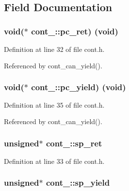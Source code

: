 \subsection{Field Documentation}
\subsubsection[{\texorpdfstring{pc\+\_\+ret}{pc_ret}}]{\setlength{\rightskip}{0pt plus 5cm}void($\ast$ cont\+\_\+\+::pc\+\_\+ret) (void)}\hypertarget{structcont___a629ed7b6bf785c9027c7fc9eaac32f6e}{}\label{structcont___a629ed7b6bf785c9027c7fc9eaac32f6e}


Definition at line 32 of file cont.\+h.



Referenced by cont\+\_\+can\+\_\+yield().

\subsubsection[{\texorpdfstring{pc\+\_\+yield}{pc_yield}}]{\setlength{\rightskip}{0pt plus 5cm}void($\ast$ cont\+\_\+\+::pc\+\_\+yield) (void)}\hypertarget{structcont___af0d518438302b7f8629c06c85f5c41ae}{}\label{structcont___af0d518438302b7f8629c06c85f5c41ae}


Definition at line 35 of file cont.\+h.



Referenced by cont\+\_\+can\+\_\+yield().

\subsubsection[{\texorpdfstring{sp\+\_\+ret}{sp_ret}}]{\setlength{\rightskip}{0pt plus 5cm}unsigned$\ast$ cont\+\_\+\+::sp\+\_\+ret}\hypertarget{structcont___a2f886d4182bed43aaf66d3a55a2d23b7}{}\label{structcont___a2f886d4182bed43aaf66d3a55a2d23b7}


Definition at line 33 of file cont.\+h.

\subsubsection[{\texorpdfstring{sp\+\_\+yield}{sp_yield}}]{\setlength{\rightskip}{0pt plus 5cm}unsigned$\ast$ cont\+\_\+\+::sp\+\_\+yield}\hypertarget{structcont___a59ce8d64c25ff1d02ae24c61080bbf7c}{}\label{structcont___a59ce8d64c25ff1d02ae24c61080bbf7c}


